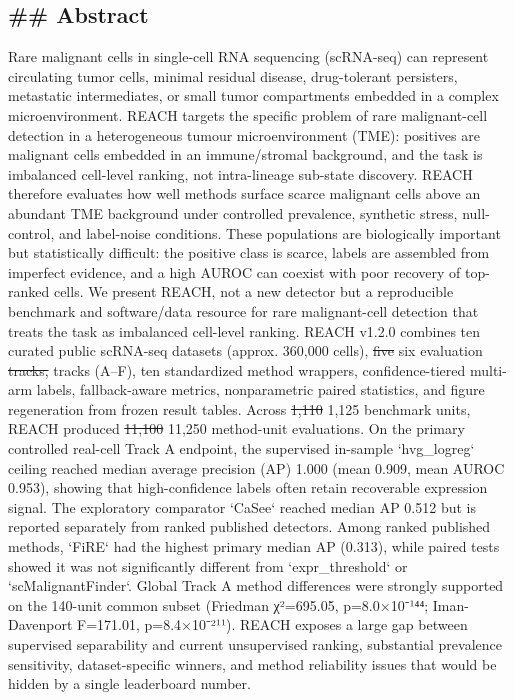 \documentclass[11pt]{article}
\newcommand{\added}[1]{{\color{trackred}#1}}
\newcommand{\deleted}[1]{{\color{trackred}\sout{#1}}}
\begin{document}
\subsection*{\#\# Abstract}
Rare malignant cells in single-cell RNA sequencing (scRNA-seq) can represent circulating tumor cells, minimal residual disease, drug-tolerant persisters, metastatic intermediates, or small tumor compartments embedded in a complex microenvironment. \added{REACH targets the specific problem of rare malignant-cell detection in a heterogeneous tumour microenvironment (TME): positives are malignant cells embedded in an immune/stromal background, and the task is imbalanced cell-level ranking, not intra-lineage sub-state discovery. REACH therefore evaluates how well methods surface scarce malignant cells above an abundant TME background under controlled prevalence, synthetic stress, null-control, and label-noise conditions.} These populations are biologically important but statistically difficult: the positive class is scarce, labels are assembled from imperfect evidence, and a high AUROC can coexist with poor recovery of top-ranked cells. We present REACH, not a new detector but a reproducible benchmark and software/data resource for rare malignant-cell detection that treats the task as imbalanced cell-level ranking. REACH v1.2.0 combines ten curated public scRNA-seq datasets (approx. 360,000 cells), \deleted{five} \added{six} evaluation \deleted{tracks,} \added{tracks (A–F),} ten standardized method wrappers, confidence-tiered multi-arm labels, fallback-aware metrics, nonparametric paired statistics, and figure regeneration from frozen result tables. Across \deleted{1,110} \added{1,125} benchmark units, REACH produced \deleted{11,100} \added{11,250} method-unit evaluations. On the primary controlled real-cell Track A endpoint, the supervised in-sample `hvg_logreg` ceiling reached median average precision (AP) 1.000 (mean 0.909, mean AUROC 0.953), showing that high-confidence labels often retain recoverable expression signal. The exploratory comparator `CaSee` reached median AP 0.512 but is reported separately from ranked published detectors. Among ranked published methods, `FiRE` had the highest primary median AP (0.313), while paired tests showed it was not significantly different from `expr_threshold` or `scMalignantFinder`. Global Track A method differences were strongly supported on the 140-unit common subset (Friedman χ²=695.05, p=8.0×10⁻¹⁴⁴; Iman-Davenport F=171.01, p=8.4×10⁻²¹¹). REACH exposes a large gap between supervised separability and current unsupervised ranking, substantial prevalence sensitivity, dataset-specific winners, and method reliability issues that would be hidden by a single leaderboard number.
\end{document}
